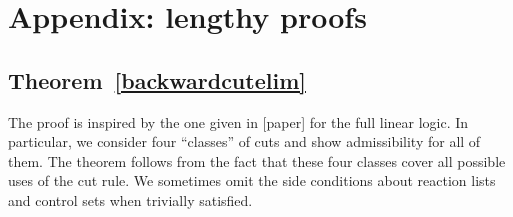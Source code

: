 \section{Appendix: lengthy proofs}

\subsection{Theorem~\ref{backwardcutelim}}

The proof is inspired by the one given in [paper] for the full linear
logic. In particular, we consider four ``classes'' of cuts and show
admissibility for all of them. The theorem follows from the fact that these
four classes cover all possible uses of the cut rule.
We sometimes omit the side conditions about reaction lists and control sets
when trivially satisfied.

